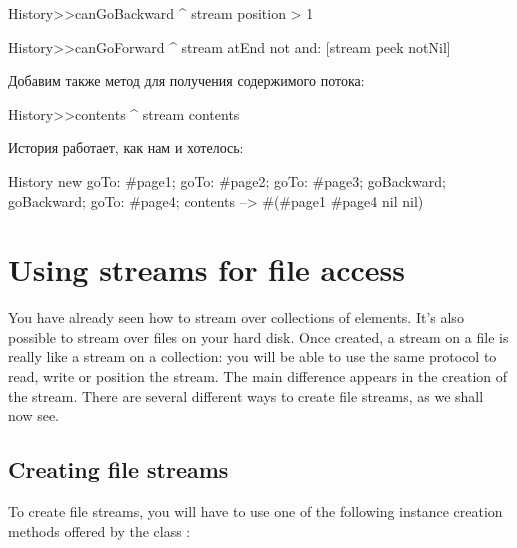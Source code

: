 \documentclass[a4paper,10pt,twoside]{book}
\begin{document}
\begin{code}{}
History>>canGoBackward
  ^ stream position > 1

History>>canGoForward
  ^ stream atEnd not and: [stream peek notNil]
\end{code}

Добавим также метод для получения содержимого потока:
\begin{code}{}
History>>contents
  ^ stream contents
\end{code}

История работает, как нам и хотелось:
\begin{code}{}
History new
	goTo: #page1;
	goTo: #page2;
	goTo: #page3;
	goBackward;
	goBackward;
	goTo: #page4;
	contents --> #(#page1 #page4 nil nil)
\end{code}

\section{Using streams for file access}

You have already seen how to stream over collections of elements. It's
also possible to stream over files on your hard disk.
Once created, a stream on a file is really like a stream on a
collection: you will be able to use the same protocol to read, write
or position the stream.
The main difference appears in the creation of the stream.
There are several different ways to create file streams, as we shall now see.

\subsection{Creating file streams}

To create file streams, you will have to use one of the following
instance creation methods offered by the class :
\end{document}

